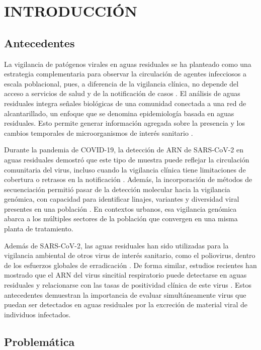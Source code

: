 \section{INTRODUCCIÓN}

\subsection{Antecedentes}

La vigilancia de patógenos virales en aguas residuales se ha planteado como una estrategia complementaria para observar la circulación de agentes infecciosos a escala poblacional, pues, a diferencia de la vigilancia clínica, no depende del acceso a servicios de salud y de la notificación de casos \cite{Parkins_2023}. El análisis de aguas residuales integra señales biológicas de una comunidad conectada a una red de alcantarillado, un enfoque que se denomina epidemiología basada en aguas residuales. Esto permite generar información agregada sobre la presencia y los cambios temporales de microorganismos de interés sanitario \cite{Sims_2020}.

Durante la pandemia de COVID-19, la detección de ARN de SARS-CoV-2 en aguas residuales demostró que este tipo de muestra puede reflejar la circulación comunitaria del virus, incluso cuando la vigilancia clínica tiene limitaciones de cobertura o retrasos en la notificación \cite{Ahmed_2020,Medema_2020}. Además, la incorporación de métodos de secuenciación permitió pasar de la detección molecular hacia la vigilancia genómica, con capacidad para identificar linajes, variantes y diversidad viral presentes en una población \cite{Crits_Christoph_2021}. En contextos urbanos, esa vigilancia genómica abarca a los múltiples sectores de la población que convergen en una misma planta de tratamiento.

Además de SARS-CoV-2, las aguas residuales han sido utilizadas para la vigilancia ambiental de otros virus de interés sanitario, como el poliovirus, dentro de los esfuerzos globales de erradicación \cite{Asghar_2014}. De forma similar, estudios recientes han mostrado que el ARN del virus sincitial respiratorio puede detectarse en aguas residuales y relacionarse con las tasas de positividad clínica de este virus \cite{Hughes_2022}. Estos antecedentes demuestran la importancia de evaluar simultáneamente virus que puedan ser detectados en aguas residuales por la excreción de material viral de individuos infectados.

\subsection{Problemática}

